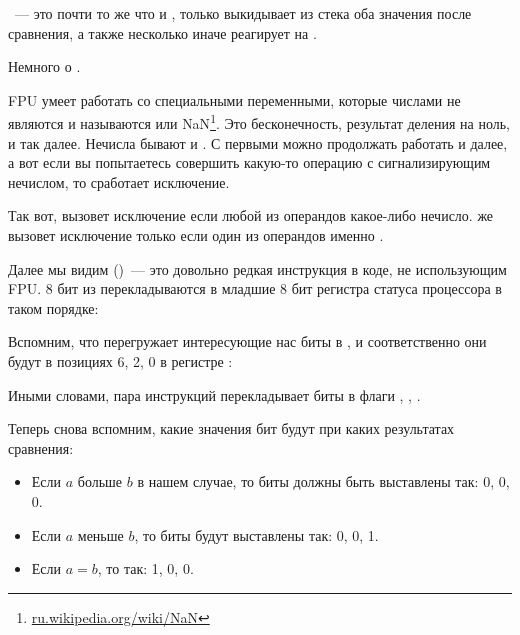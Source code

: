 


\FUCOMPP~--- это почти то же что и \FCOM, только выкидывает из стека оба значения после сравнения, 
а также несколько иначе реагирует на .

Немного о .

\newcommand{\NANFN}{\footnote{\href{http://go.yurichev.com/17129}{ru.wikipedia.org/wiki/NaN}}}

FPU умеет работать со специальными переменными, которые числами не являются и называются  или 
\gls{NaN}\NANFN. 
Это бесконечность, результат деления на ноль, и так далее. Нечисла бывают  и . 
С первыми можно продолжать работать и далее, а вот если вы попытаетесь совершить какую-то операцию 
с сигнализирующим нечислом, то сработает исключение.

Так вот, \FCOM вызовет исключение если любой из операндов какое-либо нечисло.
\FUCOM же вызовет исключение только если один из операндов именно .

\label{SAHF}
Далее мы видим \SAHF ()~--- это довольно редкая инструкция в коде, не использующим FPU. 
8 бит из \AH перекладываются в младшие 8 бит регистра статуса процессора в таком порядке:



Вспомним, что \FNSTSW перегружает интересующие нас биты \CThreeBits в \AH, 
и соответственно они будут в позициях 6, 2, 0 в регистре \AH:



Иными словами, пара инструкций  перекладывает биты \CThreeBits в флаги \ZF, \PF, \CF.

Теперь снова вспомним, какие значения бит \CThreeBits будут при каких результатах сравнения:

\begin{itemize}
\item Если $a$ больше $b$ в нашем случае, то биты \CThreeBits должны быть выставлены так: 0, 0, 0.
\item Если $a$ меньше $b$, то биты будут выставлены так: 0, 0, 1.
\item Если $a=b$, то так: 1, 0, 0.
\end{itemize}

